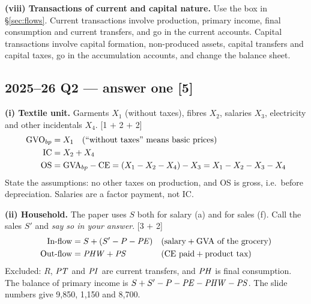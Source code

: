 \textbf{(viii) Transactions of current and capital nature.} Use the box in \S\ref{sec:flows}.
Current transactions involve production, primary income, final consumption and current transfers,
and go in the current accounts. Capital transactions involve capital formation, non-produced
assets, capital transfers and capital taxes, go in the accumulation accounts, and change the
balance sheet.

\subsection*{2025--26 Q2 --- answer one \hfill [5]}

\textbf{(i) Textile unit.} Garments $X_1$ (without taxes), fibres $X_2$, salaries $X_3$,
electricity and other incidentals $X_4$. [1 $+$ 2 $+$ 2]
\begin{align*}
\mathrm{GVO}_{bp} &= X_1 \quad \text{(``without taxes'' means basic prices)}\\
\mathrm{IC} &= X_2+X_4\\
\mathrm{OS} &= \mathrm{GVA}_{bp}-\mathrm{CE}=(X_1-X_2-X_4)-X_3=X_1-X_2-X_3-X_4
\end{align*}
State the assumptions: no other taxes on production, and OS is gross, i.e.\ before depreciation.
Salaries are a factor payment, not IC.

\textbf{(ii) Household.} The paper uses $S$ both for salary (a) and for sales (f). Call the sales
$S'$ and \emph{say so in your answer}. [3 $+$ 2]
\begin{align*}
\text{In-flow} &= S+(S'-P-\mathit{PE}) && (\text{salary} + \text{GVA of the grocery})\\
\text{Out-flow} &= \mathit{PHW}+\mathit{PS} && (\text{CE paid} + \text{product tax})
\end{align*}
Excluded: $R$, $\mathit{PT}$ and $\mathit{PI}$ are current transfers, and $\mathit{PH}$ is final
consumption. The balance of primary income is $S+S'-P-\mathit{PE}-\mathit{PHW}-\mathit{PS}$. The slide
numbers give 9,850, 1,150 and 8,700.
